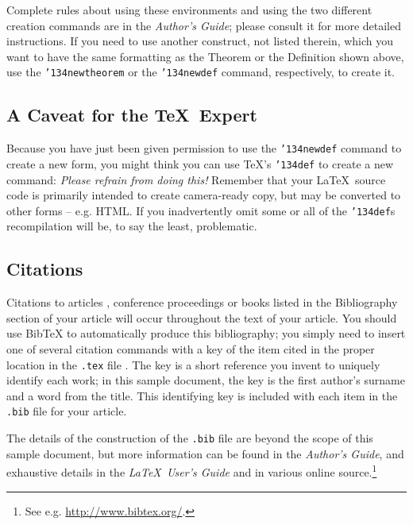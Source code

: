 \documentclass{style/nime-alternate}
\begin{document}
Complete rules about using these environments and using the
two different creation commands are in the
\textit{Author's Guide}; please consult it for more
detailed instructions.  If you need to use another construct,
not listed therein, which you want to have the same
formatting as the Theorem
or the Definition \cite{salas:calculus} shown above,
use the \texttt{{\char'134}newtheorem} or the
\texttt{{\char'134}newdef} command,
respectively, to create it.

\subsection{A {\secit Caveat} for the \TeX\ Expert}
Because you have just been given permission to
use the \texttt{{\char'134}newdef} command to create a
new form, you might think you can
use \TeX's \texttt{{\char'134}def} to create a
new command: \textit{Please refrain from doing this!}
Remember that your \LaTeX\ source code is primarily intended
to create camera-ready copy, but may be converted
to other forms -- e.g. HTML. If you inadvertently omit
some or all of the \texttt{{\char'134}def}s recompilation will
be, to say the least, problematic.



\subsection{Citations}
Citations to articles \cite{bowman:reasoning,
clark:pct, braams:babel, herlihy:methodology},
conference proceedings \cite{clark:pct} or
books \cite{salas:calculus, Lamport:LaTeX} listed
in the Bibliography section of your
article will occur throughout the text of your article.
You should use BibTeX to automatically produce this bibliography;
you simply need to insert one of several citation commands with
a key of the item cited in the proper location in
the \texttt{.tex} file \cite{Lamport:LaTeX}.
The key is a short reference you invent to uniquely
identify each work; in this sample document, the key is
the first author's surname and a
word from the title.  This identifying key is included
with each item in the \texttt{.bib} file for your article.

The details of the construction of the \texttt{.bib} file
are beyond the scope of this sample document, but more
information can be found in the \textit{Author's Guide},
and exhaustive details in the \textit{\LaTeX\ User's
Guide} \cite{Lamport:LaTeX} and in various online source.\footnote{See e.g. \url{http://www.bibtex.org/}.}
\end{document}
